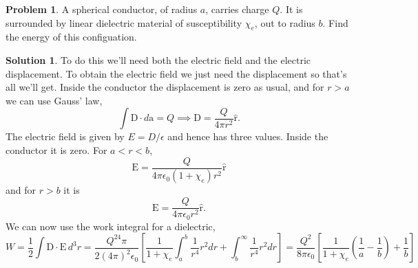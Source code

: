 \documentclass[10pt]{article}
\theoremstyle{definition}
\newtheorem{problem}{Problem}
\newtheorem{soln}{Solution}
\newcommand{\uv}[1]{\hat{\bv{{#1}}}}
\newcommand{\bv}[1]{\bm{\mathrm{#1}}}
\begin{document}
\begin{problem}
A spherical conductor, of radius $a$, carries charge $Q$.
It is surrounded by linear dielectric material of susceptibility $\chi_e$, out to radius $b$. Find the energy of this configuation.
\end{problem}
\begin{soln} To do this we'll need both the electric field and the electric displacement. To obtain the electric field we just need the displacement so that's all we'll 
get. Inside the conductor the displacement is zero as usual, and for $r>a$ we can use Gauss' law,
$$\int \bv{D}\cdot d\bv{a}=Q\implies \bv{D}=\frac{Q}{4\pi r^2}\uv{r}.$$
The electric field is given by $E=D/\epsilon$ and hence has three values. Inside the conductor it is zero. For $a<r<b$, $$\bv{E}=\frac{Q}{4\pi\epsilon_0(1+\chi_e) r^2}\uv{r}$$
and for $r>b$ it is $$\bv{E}=\frac{Q}{4\pi\epsilon_0 r^2}\uv{r}.$$
We can now use the work integral for a dielectric, 
$$W=\frac{1}{2}\int\bv{D}\cdot\bv{E}\,d^3r=\frac{Q^24\pi}{2(4\pi)^2\epsilon_0}\left[\frac{1}{1+\chi_e}\int_{a}^{b}\frac{1}{r^4}r^2dr+\int_{b}^{\infty}\frac{1}{r^4}r^2dr\right]
=\frac{Q^2}{8\pi\epsilon_0}\left[\frac{1}{1+\chi_e}\left(\frac{1}{a}-\frac{1}{b}\right)+\frac{1}{b}\right]
$$
\end{soln}
\end{document}
